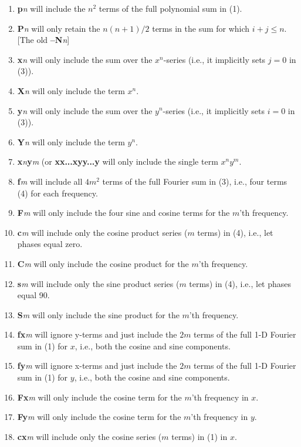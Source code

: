 \documentclass[12pt,letterpaper,margin=0.5in]{report}
\begin{document}
\begin{enumerate}
	\item {\bf p}{\it n} will include the $n^2$ terms of the full polynomial sum in (1).
	\item {\bf P}{\it n} will only retain the $n(n+1)/2$ terms in the sum for which $i+j \leq n$.  [The old {\bf --N}{\it n}]
	\item {\bf x}{\it n} will only include the sum over the $x^n$-series (i.e., it implicitly sets $j = 0$ in (3)).
	\item {\bf X}{\it n} will only include the term $x^n$.
	\item {\bf y}{\it n} will only include the sum over the $y^n$-series (i.e., it implicitly sets $i = 0$ in (3)).
	\item {\bf Y}{\it n} will only include the term $y^n$.
	\item {\bf x}{\it n}{\bf y}{\it m} (or {\bf xx...xyy...y} will only include the single term $x^ny^m$.
	\item {\bf f}{\it m} will include all $4m^2$ terms of the full Fourier sum in (3), i.e., four terms (4) for each frequency.
	\item {\bf F}{\it m} will only include the four sine and cosine terms for the $m$'th frequency.
	\item {\bf c}{\it m} will include only the cosine product series ($m$ terms) in (4), i.e., let phases equal zero.
	\item {\bf C}{\it m} will only include the cosine product for the $m$'th frequency.
	\item {\bf s}{\it m} will include only the sine product series ($m$ terms) in (4), i.e., let phases equal 90.
	\item {\bf S}{\it m} will only include the sine product for the $m$'th frequency.
	\item {\bf fx}{\it m} will ignore y-terms and just include the $2m$ terms of the full 1-D Fourier sum in (1) for $x$, i.e., both the cosine and sine components.
	\item {\bf fy}{\it m} will ignore x-terms and just include the $2m$ terms of the full 1-D Fourier sum in (1) for $y$, i.e., both the cosine and sine components.
	\item {\bf Fx}{\it m} will only include the cosine term for the $m$'th frequency in $x$.
	\item {\bf Fy}{\it m} will only include the cosine term for the $m$'th frequency in $y$.
	\item {\bf cx}{\it m} will include only the cosine series ($m$ terms) in (1) in $x$.

\end{enumerate}
\end{document}
